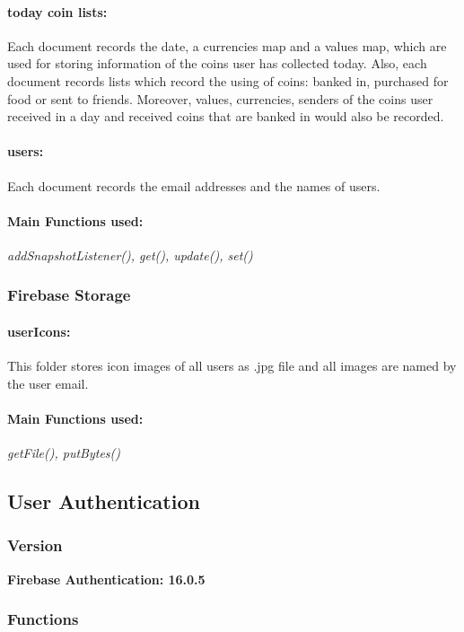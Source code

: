 \documentclass[12pt]{article}
\begin{document}
\paragraph{today coin lists:}
Each document records the date, a currencies map and a values map, which are used for storing information of the coins user has collected today. Also, each document records lists which record the using of coins: banked in, purchased for food or sent to friends. Moreover, values, currencies, senders of the coins user received in a day and received coins that are banked in would also be recorded.
\paragraph{users:}
Each document records the email addresses and the names of users.
\paragraph{Main Functions used:} \textit{addSnapshotListener(), get(), update(), set()}
\subsubsection{Firebase Storage}
\paragraph{userIcons:} This folder stores icon images of all users as .jpg file and all images are named by the user email.
\paragraph{Main Functions used:} \textit{getFile(), putBytes()}

\subsection{User Authentication}
\subsubsection{Version}
\hspace{12pt}\textbf{Firebase Authentication: 16.0.5}
\subsubsection{Functions}
\end{document}
